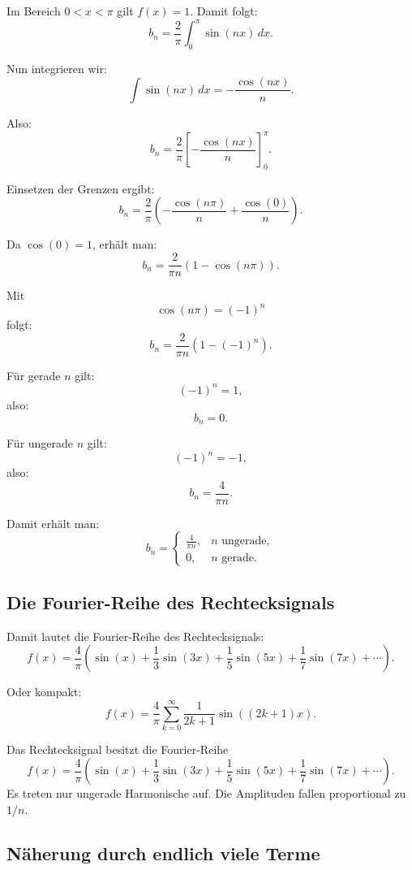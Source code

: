 Im Bereich \(0<x<\pi\) gilt \(f(x)=1\).
Damit folgt:
\[
b_n=\frac{2}{\pi}\int_{0}^{\pi}\sin(nx)\,dx.
\]

Nun integrieren wir:
\[
\int \sin(nx)\,dx=-\frac{\cos(nx)}{n}.
\]

Also:
\[
b_n=\frac{2}{\pi}
\left[
-\frac{\cos(nx)}{n}
\right]_{0}^{\pi}.
\]

Einsetzen der Grenzen ergibt:
\[
b_n=\frac{2}{\pi}
\left(
-\frac{\cos(n\pi)}{n}
+\frac{\cos(0)}{n}
\right).
\]

Da \(\cos(0)=1\), erhält man:
\[
b_n=\frac{2}{\pi n}
\left(1-\cos(n\pi)\right).
\]

Mit
\[
\cos(n\pi)=(-1)^n
\]
folgt:
\[
b_n=\frac{2}{\pi n}
\left(1-(-1)^n\right).
\]

Für gerade \(n\) gilt:
\[
(-1)^n=1,
\]
also:
\[
b_n=0.
\]

Für ungerade \(n\) gilt:
\[
(-1)^n=-1,
\]
also:
\[
b_n=\frac{4}{\pi n}.
\]

Damit erhält man:
\[
b_n=
\begin{cases}
	\frac{4}{\pi n}, & n \text{ ungerade},\\
	0, & n \text{ gerade}.
\end{cases}
\]

\subsection{Die Fourier-Reihe des Rechtecksignals}

Damit lautet die Fourier-Reihe des Rechtecksignals:
\[
f(x)=\frac{4}{\pi}
\left(
\sin(x)
+\frac{1}{3}\sin(3x)
+\frac{1}{5}\sin(5x)
+\frac{1}{7}\sin(7x)
+\cdots
\right).
\]

Oder kompakt:
\[
f(x)=\frac{4}{\pi}
\sum_{k=0}^{\infty}
\frac{1}{2k+1}
\sin\left((2k+1)x\right).
\]

\begin{MathBox}
	\label{box:anhangA-fourier-rechteckreihe}
	\small
	Das Rechtecksignal besitzt die Fourier-Reihe
	\[
	f(x)=\frac{4}{\pi}
	\left(
	\sin(x)
	+\frac{1}{3}\sin(3x)
	+\frac{1}{5}\sin(5x)
	+\frac{1}{7}\sin(7x)
	+\cdots
	\right).
	\]
	Es treten nur ungerade Harmonische auf.
	Die Amplituden fallen proportional zu \(1/n\).
\end{MathBox}

\subsection{Näherung durch endlich viele Terme}

